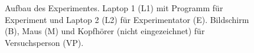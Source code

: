 \documentclass[doc,a4paper,12pt]{apa6}
\begin{document}
\begin{figure}
  \centering
  \begin{minipage}{.55\textwidth}
    \setlength{\fboxsep}{.05\textwidth}
    \vspace{10pt}
    \caption{Aufbau des Experimentes. Laptop 1 (L1) mit Programm für Experiment und Laptop 2 (L2) für Experimentator (E). Bildschirm (B), Maus (M) und Kopfhörer (nicht eingezeichnet) für Versuchsperson (VP).}
  \end{minipage}
  \vspace{-15pt}
\end{figure}

\end{document}

